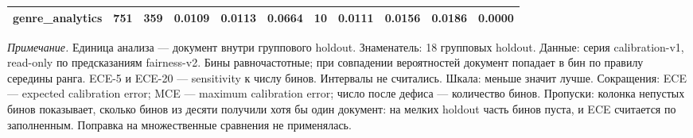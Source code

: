 \begin{table}[htbp]
\begin{tabular}{lllllllllll}
genre\_analytics & 751 & 359 & 0.0109 & 0.0113 & 0.0664 & 10 & 0.0111 & 0.0156 & 0.0186 & 0.0000 \\
\bottomrule
\end{tabular}
\begin{minipage}{\linewidth}\footnotesize\vspace{2pt}
\textit{Примечание.} Единица анализа — документ внутри группового holdout. Знаменатель: 18 групповых holdout. Данные: серия calibration-v1, read-only по предсказаниям fairness-v2. Бины равночастотные; при совпадении вероятностей документ попадает в бин по правилу середины ранга. ECE-5 и ECE-20 — sensitivity к числу бинов. Интервалы не считались. Шкала: меньше значит лучше. Сокращения: ECE — expected calibration error; MCE — maximum calibration error; число после дефиса — количество бинов. Пропуски: колонка непустых бинов показывает, сколько бинов из десяти получили хотя бы один документ: на мелких holdout часть бинов пуста, и ECE считается по заполненным. Поправка на множественные сравнения не применялась.
\end{minipage}
\end{table}

